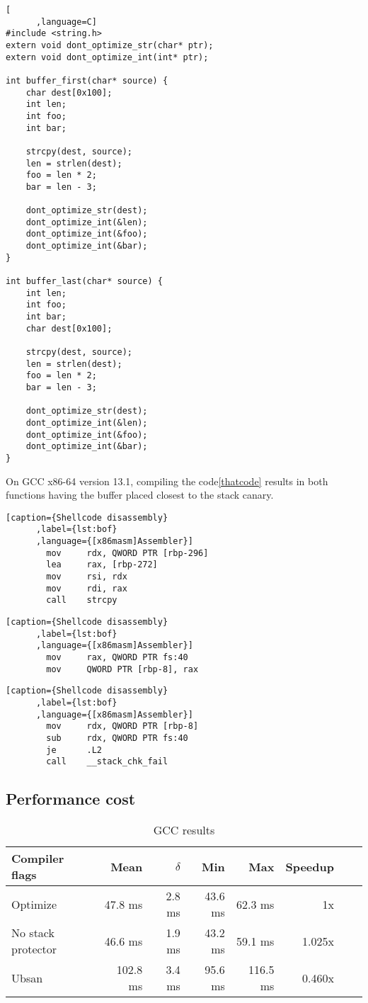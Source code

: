\documentclass{article}
\begin{document}
\begin{lstlisting}[
      ,language=C]
#include <string.h>
extern void dont_optimize_str(char* ptr);
extern void dont_optimize_int(int* ptr);

int buffer_first(char* source) {
    char dest[0x100];
    int len;
    int foo;
    int bar;

    strcpy(dest, source);
    len = strlen(dest);
    foo = len * 2;
    bar = len - 3;

    dont_optimize_str(dest);
    dont_optimize_int(&len);
    dont_optimize_int(&foo);
    dont_optimize_int(&bar);
}

int buffer_last(char* source) {
    int len;
    int foo;
    int bar;
    char dest[0x100];

    strcpy(dest, source);
    len = strlen(dest);
    foo = len * 2;
    bar = len - 3;

    dont_optimize_str(dest);
    dont_optimize_int(&len);
    dont_optimize_int(&foo);
    dont_optimize_int(&bar);
}
\end{lstlisting}%
\label{code:example_func}

On GCC x86-64 version 13.1, compiling the code\ref{thatcode} results in both functions having the buffer
placed closest to the stack canary.

\begin{lstlisting}[caption={Shellcode disassembly}
      ,label={lst:bof}
      ,language={[x86masm]Assembler}]
        mov     rdx, QWORD PTR [rbp-296]
        lea     rax, [rbp-272]
        mov     rsi, rdx
        mov     rdi, rax
        call    strcpy
\end{lstlisting}


\begin{lstlisting}[caption={Shellcode disassembly}
      ,label={lst:bof}
      ,language={[x86masm]Assembler}]
        mov     rax, QWORD PTR fs:40
        mov     QWORD PTR [rbp-8], rax
\end{lstlisting}


\begin{lstlisting}[caption={Shellcode disassembly}
      ,label={lst:bof}
      ,language={[x86masm]Assembler}]
        mov     rdx, QWORD PTR [rbp-8]
        sub     rdx, QWORD PTR fs:40
        je      .L2
        call    __stack_chk_fail
\end{lstlisting}

\subsection{Performance cost}
\begin{table}[ht]
\centering
\begin{tabular}{|l|r|r|r|r|r|r|r|}
\hline
Compiler flags & Mean & $\delta$ & Min & Max & Speedup \\
\hline
 Optimize &  47.8 ms & 2.8 ms & 43.6 ms & 62.3 ms & 1x \\
 No stack protector&  46.6 ms & 1.9 ms  & 43.2 ms  &  59.1 ms & 1.025x \\
 Ubsan &  102.8 ms & 3.4 ms & 95.6 ms  & 116.5 ms & 0.460x \\
\hline
\end{tabular}
\caption{GCC results}
\label{table:your_label}
\end{table}
\end{document}
